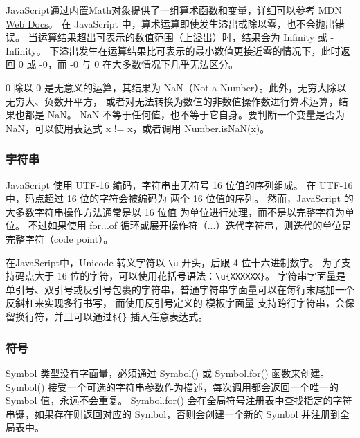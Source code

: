 JavaScript通过内置Math对象提供了一组算术函数和变量，详细可以参考
\href{https://developer.mozilla.org/zh-CN/docs/Web/JavaScript/Reference/Global_Objects}{MDN Web Docs}。
在 JavaScript 中，算术运算即使发生溢出或除以零，也不会抛出错误。
当运算结果超出可表示的数值范围（上溢出）时，结果会为 Infinity 或 -Infinity。
下溢出发生在运算结果比可表示的最小数值更接近零的情况下，此时返回 0 或 -0，而 -0 与 0 在大多数情况下几乎无法区分。

0 除以 0 是无意义的运算，其结果为 NaN（Not a Number）。此外，无穷大除以无穷大、负数开平方，
或者对无法转换为数值的非数值操作数进行算术运算，结果也都是 NaN。
NaN 不等于任何值，也不等于它自身。要判断一个变量是否为 NaN，可以使用表达式 x != x，或者调用 Number.isNaN(x)。

\subsubsection{字符串}
JavaScript 使用 UTF-16 编码，字符串由无符号 16 位值的序列组成。
在 UTF-16 中，码点超过 16 位的字符会被编码为 两个 16 位值的序列。
然而，JavaScript 的大多数字符串操作方法通常是以 16 位值 为单位进行处理，而不是以完整字符为单位。
不过如果使用 for...of 循环或展开操作符（...）迭代字符串，则迭代的单位是完整字符（code point）。

在JavaScript中，Unicode 转义字符以 \verb|\u| 开头，后跟 4 位十六进制数字。
为了支持码点大于 16 位的字符，可以使用花括号语法：\verb|\u{XXXXXX}|。
字符串字面量是单引号、双引号或反引号包裹的字符串，普通字符串字面量可以在每行末尾加一个反斜杠来实现多行书写，
而使用反引号定义的 模板字面量 支持跨行字符串，会保留换行符，并且可以通过\verb|${}| 插入任意表达式。

\subsubsection{符号}
Symbol 类型没有字面量，必须通过 Symbol() 或 Symbol.for() 函数来创建。
Symbol() 接受一个可选的字符串参数作为描述，每次调用都会返回一个唯一的 Symbol 值，永远不会重复。
Symbol.for() 会在全局符号注册表中查找指定的字符串键，如果存在则返回对应的 Symbol，否则会创建一个新的 Symbol 并注册到全局表中。


